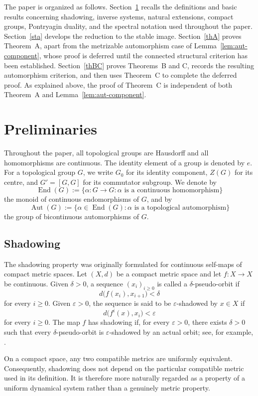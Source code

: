 \documentclass[12pt]{amsart}
\theoremstyle{definition}
\numberwithin{equation}{section}
\theoremstyle{remark}
\def\Aut{\operatorname{Aut}}
\def\End{\operatorname{End}}
\begin{document}
The paper is organized as follows. Section~\ref{pre} recalls the definitions
and basic results concerning shadowing, inverse systems, natural extensions,
compact groups, Pontryagin duality, and the spectral notation used throughout
the paper. Section~\ref{sta} develops the reduction to the stable image.
Section~\ref{thA} proves Theorem~A, apart from the metrizable automorphism
case of Lemma~\ref{lem:aut-component}, whose proof is deferred until the
connected structural criterion has been established. Section~\ref{thBC}
proves Theorems~B and C, records the resulting automorphism criterion, and
then uses Theorem~C to complete the deferred proof. As explained above, the
proof of Theorem~C is independent of both Theorem~A and
Lemma~\ref{lem:aut-component}.


\section{Preliminaries}\label{pre}

Throughout the paper, all topological groups are Hausdorff and all homomorphisms are continuous. The identity element of a group is denoted by $e$.
 For a topological group $G$, we write $G_0$ for its identity component, $Z(G)$ for its centre, and $G'=[G,G]$ for its commutator subgroup.
  We denote by \[ \End(G) := \{\alpha:G\to G:\alpha\text{ is a continuous homomorphism}\} \] the monoid of continuous endomorphisms of $G$, 
  and by \[ \Aut(G) := \{\alpha\in\End(G):\alpha\text{ is a topological automorphism}\} \] the group of bicontinuous automorphisms of $G$.
  

\subsection{Shadowing}

The shadowing property was originally formulated for continuous
self-maps of compact metric spaces. Let $(X,d)$ be a compact metric
space and let $f:X\to X$ be continuous. Given $\delta>0$, a sequence
$(x_i)_{i\geq0}$ is called a $\delta$-pseudo-orbit if
\[
d\bigl(f(x_i),x_{i+1}\bigr)<\delta
\]
for every $i\geq0$. Given $\varepsilon>0$, the sequence is said to be
$\varepsilon$-shadowed by $x\in X$ if
\[
d\bigl(f^i(x),x_i\bigr)<\varepsilon
\]
for every $i\geq0$. The map $f$ has shadowing if, for every
$\varepsilon>0$, there exists $\delta>0$ such that every
$\delta$-pseudo-orbit is $\varepsilon$-shadowed by an actual orbit;
see, for example, \cite{AH,Pilyugin}.

On a compact space, any two compatible metrics are uniformly
equivalent. Consequently, shadowing does not depend on the particular
compatible metric used in its definition. It is therefore more
naturally regarded as a property of a uniform dynamical system rather
than a genuinely metric property.
\end{document}
